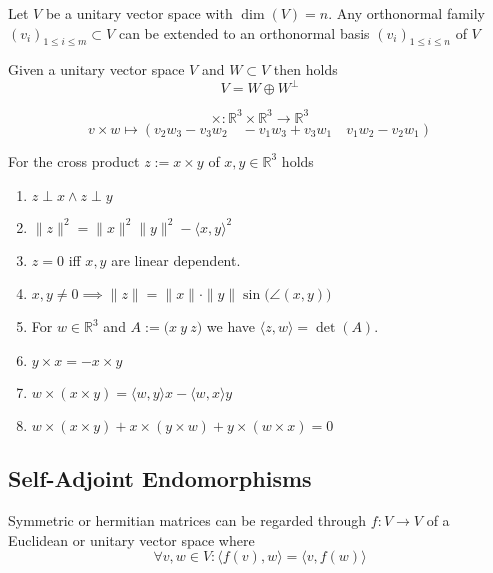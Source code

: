 \begin{proposition}
   Let \(V\) be a unitary vector space with \(\dim(V) = n\). Any orthonormal family \((v_i)_{1\leq i \leq m} \subset V\)  can be extended to an orthonormal basis \((v_i)_{1 \leq i \leq n}\) of \(V\)
\end{proposition}
\begin{corollary}
   Given a unitary vector space \(V\) and \(W \subset V\) then holds
   \[V = W \oplus W^\perp\]
\end{corollary}

\begin{definition}
   \[\times: \mathbb{R}^3 \times \mathbb{R}^3 \to \mathbb{R}^3\]
   \[v \times w \mapsto (v_2w_3 - v_3w_2 \quad -v_1w_3 + v_3w_1 \quad v_1w_2 - v_2w_1)\]
\end{definition}

\begin{proposition}
   For the cross product \(z := x \times y\) of \(x, y \in \mathbb{R}^3\) holds
   \begin{enumerate}[label=\roman*, align=Center]
      \item \(z \perp x \land z \perp y\)
      \item \(\|z\|^2 = \|x\|^2\|y\|^2 - \langle x, y \rangle^2\)
      \item \(z = 0\) iff \(x, y\) are linear dependent.
      \item \(x, y \neq 0 \implies \|z\| = \|x\|\cdot\|y\| \sin\big(\angle(x, y)\big)\)
      \item For \(w \in \mathbb{R}^3\) and \(A := \big(x~y~z\big)\) we have \(\langle z, w\rangle = \det(A)\).
      \item \(y \times x = -x \times y\)
      \item \(w \times (x \times y) = \langle w, y\rangle x- \langle w, x \rangle y\)
      \item \(w \times (x \times y) + x \times (y \times w) + y \times (w \times x) = 0\)
   \end{enumerate}
\end{proposition}

\subsection{Self-Adjoint Endomorphisms}
Symmetric or hermitian matrices can be regarded through \(f: V \to V\) of a Euclidean or unitary vector space where
\[\forall v, w \in V: \langle f(v), w\rangle = \langle v, f(w)\rangle\]

